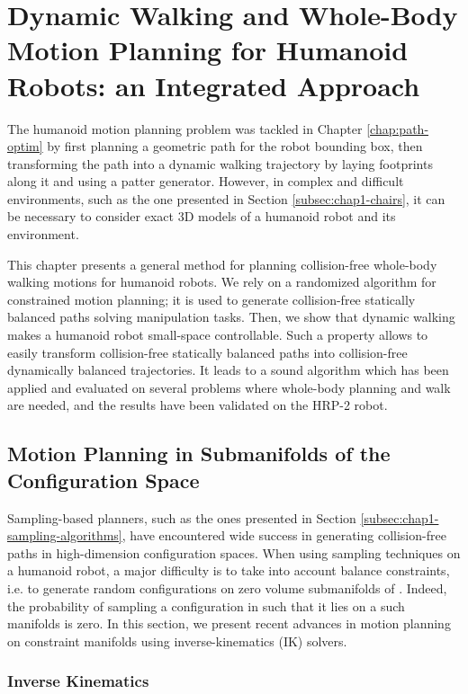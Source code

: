 \chapter{Dynamic Walking and Whole-Body Motion Planning for Humanoid Robots: an Integrated Approach}
\label{chap:wholebody-planning}

The humanoid motion planning problem was tackled in Chapter
\ref{chap:path-optim} by first planning a geometric path for the robot
bounding box, then transforming the path into a dynamic walking
trajectory by laying footprints along it and using a patter generator.
However, in complex and difficult environments, such as the one
presented in Section \ref{subsec:chap1-chairs}, it can be necessary to
consider exact 3D models of a humanoid robot and its environment.

This chapter presents a general method for planning collision-free
whole-body walking motions for humanoid robots. We rely on a
randomized algorithm for constrained motion planning; it is used to
generate collision-free statically balanced paths solving manipulation
tasks. Then, we show that dynamic walking makes a humanoid robot
small-space controllable. Such a property allows to easily transform
collision-free statically balanced paths into collision-free
dynamically balanced trajectories. It leads to a sound algorithm which
has been applied and evaluated on several problems where whole-body
planning and walk are needed, and the results have been validated on
the HRP-2 robot.

\section{Motion Planning in Submanifolds of the Configuration Space}
\label{sec:chap2-planning-submanifolds}

Sampling-based planners, such as the ones presented in Section
\ref{subsec:chap1-sampling-algorithms}, have encountered wide success
in generating collision-free paths in high-dimension configuration
spaces. When using sampling techniques on a humanoid robot, a major
difficulty is to take into account balance constraints, i.e. to
generate random configurations on zero volume submanifolds
of \cspace. Indeed, the probability of sampling a configuration
 in \cspace such that it lies on a such manifolds is
zero. In this section, we present recent advances in motion planning
on constraint manifolds using inverse-kinematics (IK) solvers. 

\subsection{Inverse Kinematics}
\label{subsec:chap2-inverse-kinematics}


